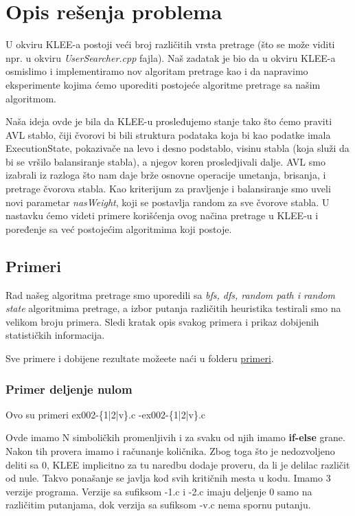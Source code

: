 \documentclass[a4paper]{article}
\begin{document}
{\section{Opis rešenja problema}
\label{sec:opis}
 	
 	U okviru KLEE-a postoji veći broj različitih vrsta pretrage (što se može viditi npr. u okviru \textit{UserSearcher.cpp} fajla). Naš zadatak je bio da u 
 	okviru KLEE-a osmislimo i implementiramo nov algoritam pretrage kao i da napravimo eksperimente kojima ćemo uporediti postojeće algoritme pretrage sa našim algoritmom.
 	
 	Naša ideja ovde je bila da KLEE-u prosleđujemo stanje tako što ćemo praviti AVL stablo, čiji čvorovi bi bili struktura podataka koja bi kao podatke imala ExecutionState, pokazivače na levo i desno podstablo, visinu stabla (koja služi da bi se vršilo balansiranje stabla), a njegov koren prosledjivali dalje. AVL smo izabrali iz razloga što nam daje brže osnovne operacije umetanja, brisanja, i pretrage čvorova stabla. Kao kriterijum za pravljenje i balansiranje smo uveli novi parametar \textit{nasWeight}, koji se postavlja random za sve čvorove stabla. U nastavku ćemo videti primere korišćenja ovog načina pretrage u KLEE-u  i poređenje sa već postojećim algoritmima koji postoje.
 	
 	\subsection{Primeri}
 	
 	Rad našeg algoritma pretrage smo uporedili sa \textit{bfs, dfs, random path i random state} algoritmima pretrage, a izbor putanja različitih heuristika testirali smo na velikom broju primera. Sledi kratak opis svakog primera i prikaz dobijenih statističkih informacija.
 	
 	Sve primere i dobijene rezultate možeete naći u folderu \href{primeri/.}{primeri}.
 	
 	\subsubsection{Primer deljenje nulom}
 	
	 	Ovo su primeri ex002-\{1|2|v\}.c -ex002-\{1|2|v\}.c
	 	
	 	Ovde imamo N simboličkih promenljivih i za svaku od njih imamo \textbf{if-else} grane. Nakon tih provera imamo i računanje količnika. Zbog toga što je nedozvoljeno deliti sa 0, KLEE implicitno za tu naredbu dodaje proveru, da li je delilac različit od nule. Takvo ponašanje se javlja kod svih kritičnih mesta u kodu. Imamo 3 verzije programa. Verzije sa sufiksom -1.c i -2.c imaju deljenje 0 samo na različitim putanjama, dok verzija sa sufiksom -v.c nema spornu putanju.
	 	
}
\end{document}
